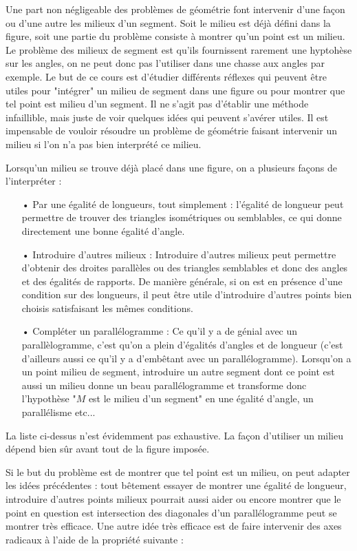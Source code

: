 Une part non négligeable des problèmes de géométrie font intervenir d'une façon ou d'une autre les milieux d'un segment. Soit le milieu est déjà défini dans la figure, soit une partie du problème consiste à montrer qu'un point est un milieu. Le problème des milieux de segment est qu'ils fournissent rarement une hyptohèse sur les angles, on ne peut donc pas l'utiliser dans une chasse aux angles par exemple. Le but de ce cours est d'étudier différents réflexes qui peuvent être utiles pour "intégrer" un milieu de segment dans une figure ou pour montrer que tel point est milieu d'un segment. Il ne s'agit pas d'établir une méthode infaillible, mais juste de voir quelques idées qui peuvent s'avérer utiles. Il est impensable de vouloir résoudre un problème de géométrie faisant intervenir un milieu si l'on n'a pas bien interprété ce milieu.

Lorsqu'un milieu se trouve déjà placé dans une figure, on a plusieurs façons de l'interpréter :
\begin{itemize}
\item[•] Par une égalité de longueurs, tout simplement : l'égalité de longueur peut permettre de trouver des triangles isométriques ou semblables, ce qui donne directement une bonne égalité d'angle.
\item[•] Introduire d'autres milieux :
Introduire d'autres milieux peut permettre d'obtenir des droites parallèles ou des triangles semblables et donc des angles et des égalités de rapports.
De manière générale, si on est en présence d'une condition sur des longueurs, il peut être utile d'introduire d'autres points bien choisis satisfaisant les mêmes conditions.
\item[•] Compléter un parallélogramme : Ce qu'il y a de génial avec un parallèlogramme, c'est qu'on a plein d'égalités d'angles et de longueur (c'est d'ailleurs aussi ce qu'il y a d'embêtant avec un parallélogramme). Lorsqu'on a un point milieu de segment, introduire un autre segment dont ce point est aussi un milieu donne un beau parallélogramme et transforme donc l'hypothèse "$M$ est le milieu d'un segment" en une égalité d'angle, un parallélisme etc...
\end{itemize}
La liste ci-dessus n'est évidemment pas exhaustive. La façon d'utiliser un milieu dépend bien sûr avant tout de la figure imposée.

Si le but du problème est de montrer que tel point est un milieu, on peut adapter les idées précédentes : tout bêtement essayer de montrer une égalité de longueur, introduire d'autres points milieux pourrait aussi aider ou encore montrer que le point en question est intersection des diagonales d'un parallélogramme peut se montrer très efficace.
Une autre idée très efficace est de faire intervenir des axes radicaux à l'aide de la propriété suivante :


